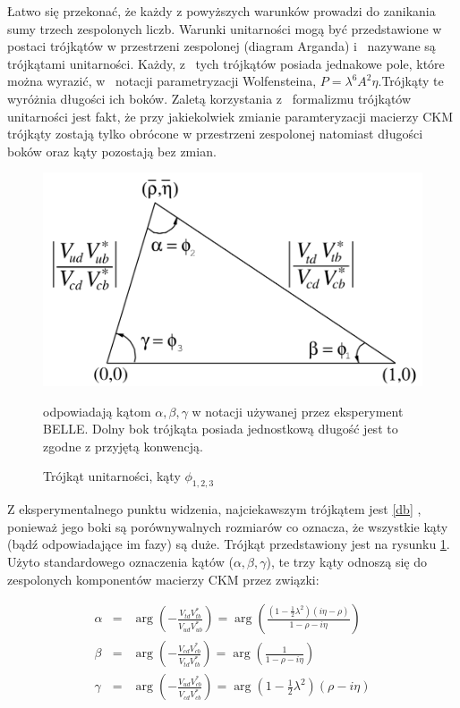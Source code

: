 Łatwo się przekonać, że każdy z powyższych warunków prowadzi do zanikania sumy trzech zespolonych liczb. Warunki unitarności mogą być przedstawione w postaci trójkątów w przestrzeni zespolonej (diagram Arganda) i~ nazywane są trójkątami unitarności. Każdy, z~ tych trójkątów posiada jednakowe pole, które można wyrazić, w~ notacji parametryzacji Wolfensteina, $P=\lambda^6A^2 \eta$.Trójkąty te wyróżnia długości ich boków.   Zaletą korzystania z~ formalizmu trójkątów unitarności jest fakt, że przy jakiekolwiek zmianie paramteryzacji macierzy CKM trójkąty zostają tylko obrócone w przestrzeni zespolonej natomiast długości boków oraz kąty pozostają bez zmian. 
 
 \begin{figure}[ht]
 \centering
 \includegraphics[scale=0.3]{rozdzial1/trojkat.png}
 \caption{Trójkąt unitarności, kąty $ \phi_{1,2,3}$} odpowiadają kątom $\alpha,\beta,\gamma$ w notacji używanej przez eksperyment BELLE. Dolny bok trójkąta posiada jednostkową długość jest to zgodne z przyjętą konwencją. \cite{PDG}
 \label{fig:trojkat db}
\end{figure}
 

Z eksperymentalnego punktu widzenia, najciekawszym trójkątem jest \ref{db} , ponieważ jego boki są porównywalnych rozmiarów co oznacza, że wszystkie kąty (bądź odpowiadające im fazy) są duże. Trójkąt przedstawiony jest na rysunku \ref{fig:trojkat db}. Użyto standardowego oznaczenia kątów ($\alpha , \beta , \gamma $), te trzy kąty odnoszą się do zespolonych komponentów macierzy CKM przez związki:

\begin{eqnarray}
\alpha &=& \arg \left(- \frac{V_{td}V^*_{tb}}{ V_{ud}V_{ub}^* }  \right) =\arg \left( \frac{(1-\frac{1}{2} \lambda^2)(i \eta -\rho )}{1-\rho -i\eta}  \right)\\
\beta &=& \arg \left(- \frac{V_{cd}V^*_{cb}}{ V_{td}V_{tb}^* }  \right) =\arg \left( \frac{1}{1-\rho -i\eta}  \right)\\
\gamma &=& \arg \left(- \frac{V_{ud}V^*_{cb}}{ V_{cd}V_{cb}^* }  \right) =\arg \left( 1-\frac{1}{2} \lambda^2 \right) \left( \rho -i \eta \right)
\end{eqnarray} 

